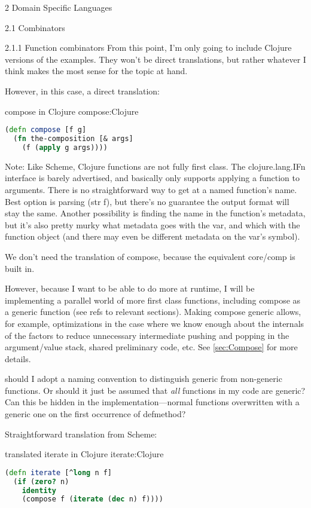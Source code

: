 \documentclass[12pt]{PalisadesLakesBook}
\begin{document}
\begin{plSection}{2 Domain Specific Languages}
\begin{plSection}{2.1 Combinators}
\begin{plSection}{2.1.1 Function combinators}
From this point, I'm only going to include Clojure versions
of the examples.
They won't be direct translations, but rather whatever I think
makes the most sense for the topic at hand.

However, in this case, a direct translation:

\begin{plListing}
{{\clojureFont compose} in Clojure}
{compose:Clojure}
\begin{lstlisting}[language=clojure]
(defn compose [f g]
  (fn the-composition [& args]
    (f (apply g args))))
\end{lstlisting}
\end{plListing}

Note: Like Scheme, Clojure functions are not fully first class.
The {\javaFont clojure.lang.IFn} interface is barely advertised,
and basically only supports applying a function to arguments.
There is no straightforward way 
to get at a named function's name.
Best option is parsing {\clojureFont (str f)},
but there's no guarantee the output format will stay the same.
Another possibility is finding the name in the function's 
metadata, but it's also pretty murky
what metadata goes with the {\clojureFont var},
and which with the function object
(and there may even be different metadata on the 
{\clojureFont var}'s symbol).

We don't need the translation of {\schemeFont compose}, 
because the equivalent {\clojureFont core/comp}
is built in.

However, because I want to be able to do more at runtime,
I will be implementing a parallel world of more first class
functions, including {\clojureFont compose}
as a generic function (see \TODO refs to relevant sections).
Making {\clojureFont compose} generic allows,
for example, optimizations in the case where we know enough
about the internals of the factors to reduce unnecessary
intermediate pushing and popping in the argument/value stack,
shared preliminary code, etc.
See \cref{sec:Compose} for more details.

\TODO should I adopt a naming convention to distinguish
generic from non-generic functions. Or should it just be assumed
that \emph{all} functions in my code are generic?
Can this be hidden in the implementation---normal functions
overwritten with a generic one on the first occurrence
of {\clojureFont defmethod}?

Straightforward translation from Scheme:
\begin{plListing}
{translated {\clojureFont iterate} in Clojure}
{iterate:Clojure}
\begin{lstlisting}[language=clojure]
(defn iterate [^long n f]
  (if (zero? n)
    identity
    (compose f (iterate (dec n) f))))
    

\end{lstlisting}
\end{plListing}
\end{plSection}
\end{plSection}
\end{plSection}
\end{document}
